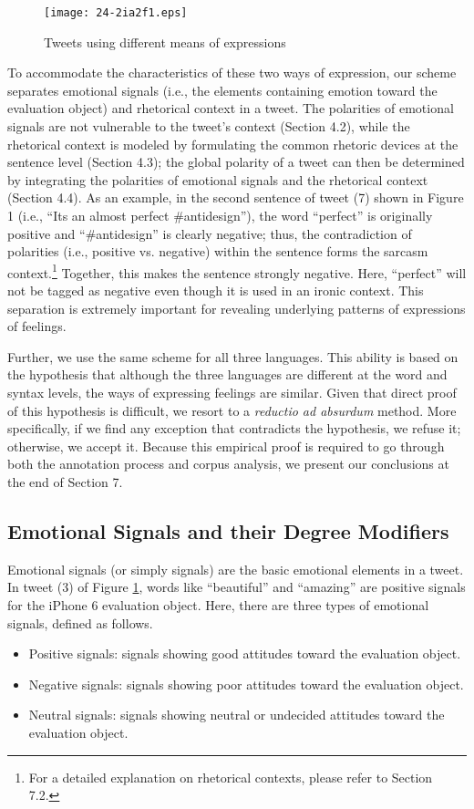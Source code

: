 \documentclass[english]{jnlp_1.4}
\begin{document}
\begin{figure}[t]
\begin{center}
\texttt{[image: 24-2ia2f1.eps]}
\end{center}
\caption{Tweets using different means of expressions}
\label{fig:tweet_examples}
\end{figure}

To accommodate the characteristics of these two ways of expression, our scheme separates emotional signals (i.e., the elements containing emotion toward the evaluation object) and rhetorical context in a tweet. The polarities of emotional signals are not vulnerable to the tweet's context (Section 4.2), while the rhetorical context is modeled by formulating the common rhetoric devices at the sentence level (Section 4.3); the global polarity of a tweet can then be determined by integrating the polarities of emotional signals and the rhetorical context (Section 4.4). As an example, in the second sentence of tweet (7) shown in Figure 1 (i.e., ``Its an almost perfect \#antidesign''), the word ``perfect'' is originally positive and ``\#antidesign'' is clearly negative; thus, the contradiction of polarities (i.e., positive vs. negative) within the sentence forms the sarcasm context.\footnote{For a detailed explanation on rhetorical contexts, please refer to Section 7.2.} Together, this makes the sentence strongly negative. Here, ``perfect'' will not be tagged as negative even though it is used in an ironic context. This separation is extremely important for revealing underlying patterns of expressions of feelings.

Further, we use the same scheme for all three languages. This ability is based on the hypothesis that although the three languages are different at the word and syntax levels, the ways of expressing feelings are similar. Given that direct proof of this hypothesis is difficult, we resort to a {\it reductio ad absurdum} method. More specifically, if we find any exception that contradicts the hypothesis, we refuse it; otherwise, we accept it. Because this empirical proof is required to go through both the annotation process and corpus analysis, we present our conclusions at the end of Section 7.


\subsection{Emotional Signals and their Degree Modifiers}

Emotional signals (or simply signals) are the basic emotional elements in a tweet. In tweet (3) of Figure \ref{fig:tweet_examples}, words like ``beautiful'' and ``amazing'' are positive signals for the iPhone 6 evaluation object. Here, there are three types of emotional signals, defined as follows.
\begin{itemize}
\item Positive signals: signals showing good attitudes toward the evaluation object.
\item Negative signals: signals showing poor attitudes toward the evaluation object.
\item Neutral signals: signals showing neutral or undecided attitudes toward the evaluation object.
\end{itemize}
\end{document}
